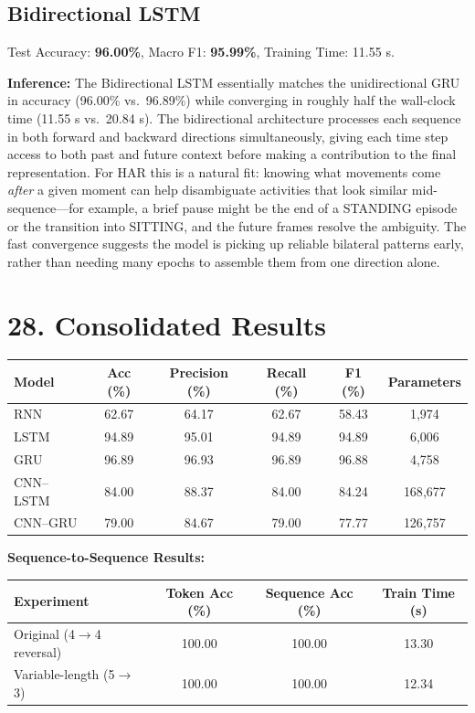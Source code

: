 \documentclass[10pt]{article}
\begin{document}
\subsection*{Bidirectional LSTM}

Test Accuracy: \textbf{96.00\%}, Macro F1: \textbf{95.99\%}, Training Time: 11.55 s.

\textbf{Inference:}
The Bidirectional LSTM essentially matches the unidirectional GRU in accuracy
(96.00\% vs.\ 96.89\%) while converging in roughly half the wall-clock time
(11.55 s vs.\ 20.84 s). The bidirectional architecture processes each sequence
in both forward and backward directions simultaneously, giving each time step
access to both past and future context before making a contribution to the
final representation. For HAR this is a natural fit: knowing what movements
come \emph{after} a given moment can help disambiguate activities that look
similar mid-sequence---for example, a brief pause might be the end of a
STANDING episode or the transition into SITTING, and the future frames
resolve the ambiguity. The fast convergence suggests the model is picking
up reliable bilateral patterns early, rather than needing many epochs to
assemble them from one direction alone.

\section*{28. Consolidated Results}

\begin{center}
\begin{tabular}{|l|c|c|c|c|c|}
\hline
Model & Acc (\%) & Precision (\%) & Recall (\%) & F1 (\%) & Parameters\\
\hline
RNN & 62.67 & 64.17 & 62.67 & 58.43 & 1{,}974\\
LSTM & 94.89 & 95.01 & 94.89 & 94.89 & 6{,}006\\
GRU & 96.89 & 96.93 & 96.89 & 96.88 & 4{,}758\\
CNN--LSTM & 84.00 & 88.37 & 84.00 & 84.24 & 168{,}677\\
CNN--GRU & 79.00 & 84.67 & 79.00 & 77.77 & 126{,}757\\
\hline
\end{tabular}
\end{center}

\textbf{Sequence-to-Sequence Results:}

\begin{center}
\begin{tabular}{|l|c|c|c|}
\hline
Experiment & Token Acc (\%) & Sequence Acc (\%) & Train Time (s)\\
\hline
Original (4$\to$4 reversal) & 100.00 & 100.00 & 13.30\\
Variable-length (5$\to$3) & 100.00 & 100.00 & 12.34\\
\hline
\end{tabular}
\end{center}
\end{document}
